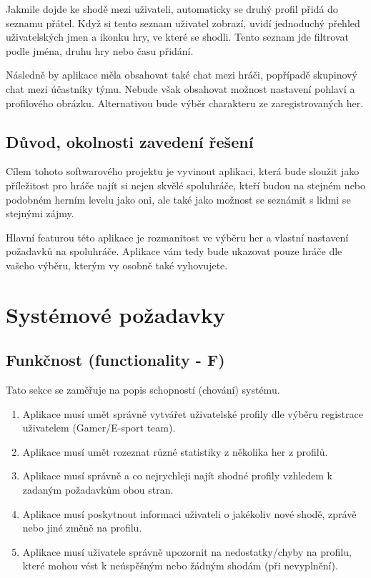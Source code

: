 \documentclass[czech,12pt,a4paper,titlepage]{article}
\begin{document}
Jakmile dojde ke shodě mezi uživateli, automaticky se druhý profil přidá do seznamu přátel. Když si tento
seznam uživatel zobrazí, uvidí jednoduchý přehled uživatelských jmen a ikonku hry, ve které se shodli.
Tento seznam jde filtrovat podle jména, druhu hry nebo času přidání.

Následně by aplikace měla obsahovat také chat mezi hráči, popřípadě skupinový chat mezi účastníky týmu.
Nebude však obsahovat možnost nastavení pohlaví a profilového obrázku.
Alternativou bude výběr charakteru ze zaregistrovaných her.

\subsection{Důvod, okolnosti zavedení řešení}

Cílem tohoto softwarového projektu je vyvinout aplikaci, která bude sloužit jako příležitost pro hráče najít
si nejen skvělé spoluhráče, kteří budou na stejném nebo podobném herním levelu jako oni, ale také jako možnost
se seznámit s lidmi se stejnými zájmy.

Hlavní featurou této aplikace je rozmanitost ve výběru her a vlastní nastavení požadavků na spoluhráče.
Aplikace vám tedy bude ukazovat pouze hráče dle vašeho výběru, kterým vy osobně také vyhovujete.
\clearpage

\section{Systémové požadavky}

\subsection{Funkčnost (functionality - F)}

Tato sekce se zaměřuje na popis schopností (chování) systému.

\begin{enumerate}
    \item Aplikace musí umět správně vytvářet uživatelské profily dle výběru registrace uživatelem (Gamer/E-sport team).
    \item Aplikace musí umět rozeznat různé statistiky z několika her z profilů.
    \item Aplikace musí správně a co nejrychleji najít shodné profily vzhledem k zadaným požadavkům obou stran.
    \item Aplikace musí poskytnout informaci uživateli o jakékoliv nové shodě, zprávě nebo jiné změně na profilu.
    \item Aplikace musí uživatele správně upozornit na nedostatky/chyby na profilu, které mohou vést k
          neúspěšným nebo žádným shodám (při nevyplnění).
\end{enumerate}
\end{document}
